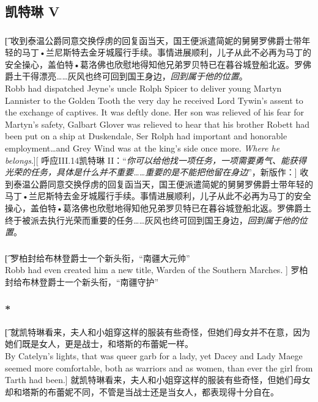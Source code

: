\documentclass[12pt,a4paper]{article}
\begin{document}
\subsection{凯特琳 V}
\subsubsection{}\t[
	收到泰温公爵同意交换俘虏的回复函当天，国王便派遣简妮的舅舅罗佛爵士带年轻的马丁•兰尼斯特去金牙城履行手续。事情进展顺利，儿子从此不必再为马丁的安全操心，盖伯特•葛洛佛也欣慰地得知他兄弟罗贝特已在暮谷城登船北返。罗佛爵土干得漂亮……灰风也终可回到国王身边，\emph{回到属于他的位置}。\\
	Robb had dispatched Jeyne's uncle Rolph Spicer to deliver young Martyn Lannister to the Golden Tooth the very day he received Lord Tywin's assent to the exchange of captives. It was deftly done. Her son was relieved of his fear for Martyn's safety, Galbart Glover was relieved to hear that his brother Robett had been put on a ship at Duskendale, Ser Rolph had important and honorable employment\ldots and Grey Wind was at the king's side once more. \emph{Where he belongs}.][
	呼应III.14凯特琳 II：“\emph{你可以给他找一项任务，一项需要勇气、能获得光荣的任务，具体是什么并不重要……重要的是不能把他留在身边}”，新版作：]
	收到泰温公爵同意交换俘虏的回复函当天，国王便派遣简妮的舅舅罗佛爵士带年轻的马丁•兰尼斯特去金牙城履行手续。事情进展顺利，儿子从此不必再为马丁的安全操心，盖伯特•葛洛佛也欣慰地得知他兄弟罗贝特已在暮谷城登船北返。罗佛爵土终于被派去执行光荣而重要的任务……灰风也终可回到国王身边，\emph{回到属于他的位置}。
	
\subsubsection{}\t[
	罗柏封给布林登爵士一个新头衔，“南疆大元帅” \\
	Robb had even created him a new title, Warden of the Southern Marches. ]
	罗柏封给布林登爵士一个新头衔，“南疆守护” 
	
\subsubsection{\color{red}*}\t[
	就凯特琳看来，夫人和小姐穿这样的服装有些奇怪，但她们母女并不在意，因为她们既是女人，更是战士，和塔斯的布蕾妮一样。\\
	By Catelyn's lights, that was queer garb for a lady, yet Dacey and Lady Maege seemed more comfortable, both as warriors and as women, than ever the girl from Tarth had been.]
	就凯特琳看来，夫人和小姐穿这样的服装有些奇怪，但她们母女却和塔斯的布蕾妮不同，不管是当战士还是当女人，都表现得十分自在。
	
\end{document}
